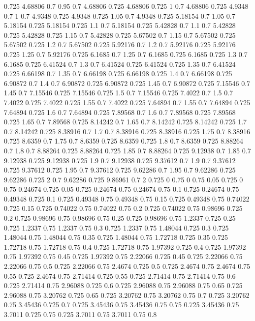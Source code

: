 0.725 4.68806
0.7 0.95
0.7 4.68806
0.725 4.68806
0.725 1
0.7 4.68806
0.725 4.9348
0.7 1
0.7 4.9348
0.725 4.9348
0.725 1.05
0.7 4.9348
0.725 5.18154
0.7 1.05
0.7 5.18154
0.725 5.18154
0.725 1.1
0.7 5.18154
0.725 5.42828
0.7 1.1
0.7 5.42828
0.725 5.42828
0.725 1.15
0.7 5.42828
0.725 5.67502
0.7 1.15
0.7 5.67502
0.725 5.67502
0.725 1.2
0.7 5.67502
0.725 5.92176
0.7 1.2
0.7 5.92176
0.725 5.92176
0.725 1.25
0.7 5.92176
0.725 6.1685
0.7 1.25
0.7 6.1685
0.725 6.1685
0.725 1.3
0.7 6.1685
0.725 6.41524
0.7 1.3
0.7 6.41524
0.725 6.41524
0.725 1.35
0.7 6.41524
0.725 6.66198
0.7 1.35
0.7 6.66198
0.725 6.66198
0.725 1.4
0.7 6.66198
0.725 6.90872
0.7 1.4
0.7 6.90872
0.725 6.90872
0.725 1.45
0.7 6.90872
0.725 7.15546
0.7 1.45
0.7 7.15546
0.725 7.15546
0.725 1.5
0.7 7.15546
0.725 7.4022
0.7 1.5
0.7 7.4022
0.725 7.4022
0.725 1.55
0.7 7.4022
0.725 7.64894
0.7 1.55
0.7 7.64894
0.725 7.64894
0.725 1.6
0.7 7.64894
0.725 7.89568
0.7 1.6
0.7 7.89568
0.725 7.89568
0.725 1.65
0.7 7.89568
0.725 8.14242
0.7 1.65
0.7 8.14242
0.725 8.14242
0.725 1.7
0.7 8.14242
0.725 8.38916
0.7 1.7
0.7 8.38916
0.725 8.38916
0.725 1.75
0.7 8.38916
0.725 8.6359
0.7 1.75
0.7 8.6359
0.725 8.6359
0.725 1.8
0.7 8.6359
0.725 8.88264
0.7 1.8
0.7 8.88264
0.725 8.88264
0.725 1.85
0.7 8.88264
0.725 9.12938
0.7 1.85
0.7 9.12938
0.725 9.12938
0.725 1.9
0.7 9.12938
0.725 9.37612
0.7 1.9
0.7 9.37612
0.725 9.37612
0.725 1.95
0.7 9.37612
0.725 9.62286
0.7 1.95
0.7 9.62286
0.725 9.62286
0.725 2
0.7 9.62286
0.725 9.86961
0.7 2
0.725 0
0.75 0
0.75 0.05
0.725 0
0.75 0.24674
0.725 0.05
0.725 0.24674
0.75 0.24674
0.75 0.1
0.725 0.24674
0.75 0.49348
0.725 0.1
0.725 0.49348
0.75 0.49348
0.75 0.15
0.725 0.49348
0.75 0.74022
0.725 0.15
0.725 0.74022
0.75 0.74022
0.75 0.2
0.725 0.74022
0.75 0.98696
0.725 0.2
0.725 0.98696
0.75 0.98696
0.75 0.25
0.725 0.98696
0.75 1.2337
0.725 0.25
0.725 1.2337
0.75 1.2337
0.75 0.3
0.725 1.2337
0.75 1.48044
0.725 0.3
0.725 1.48044
0.75 1.48044
0.75 0.35
0.725 1.48044
0.75 1.72718
0.725 0.35
0.725 1.72718
0.75 1.72718
0.75 0.4
0.725 1.72718
0.75 1.97392
0.725 0.4
0.725 1.97392
0.75 1.97392
0.75 0.45
0.725 1.97392
0.75 2.22066
0.725 0.45
0.725 2.22066
0.75 2.22066
0.75 0.5
0.725 2.22066
0.75 2.4674
0.725 0.5
0.725 2.4674
0.75 2.4674
0.75 0.55
0.725 2.4674
0.75 2.71414
0.725 0.55
0.725 2.71414
0.75 2.71414
0.75 0.6
0.725 2.71414
0.75 2.96088
0.725 0.6
0.725 2.96088
0.75 2.96088
0.75 0.65
0.725 2.96088
0.75 3.20762
0.725 0.65
0.725 3.20762
0.75 3.20762
0.75 0.7
0.725 3.20762
0.75 3.45436
0.725 0.7
0.725 3.45436
0.75 3.45436
0.75 0.75
0.725 3.45436
0.75 3.7011
0.725 0.75
0.725 3.7011
0.75 3.7011
0.75 0.8
